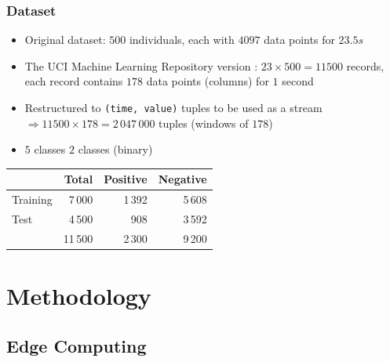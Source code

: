 \documentclass[xelatex,usenames,dvipsnames]{beamer}
\begin{document}
  \begin{frame}
    \frametitle{Dataset}
    \begin{itemize}            
      \item Original dataset\cite{PhysRevE.64.061907}: \(500\) individuals, each with \(4097\) data points for \(23.5s\) 
      
      \item The UCI Machine Learning Repository version \cite{UCIDataset}: \(23 \times 500 = 11500\) records, each record contains \(178\) data points (columns) for \(1\) second
      \item Restructured to \texttt{(time, value)} tuples to be used as a stream \(\Rightarrow 11500 \times 178 = 2\,047\,000\) tuples (windows of \(178\))
      \item \(5\) classes \rightarrow \: \(2\) classes (binary)
  \end{itemize}

  \begin{table}
    {\begin{tabular}{@{} lrrr @{}}
      \toprule
       & Total & Positive & Negative\\
      \midrule
      Training & 7\,000 & 1\,392 & 5\,608\\
      Test & 4\,500& 908 & 3\,592\\
      \addlinespace
      & 11\,500 & 2\,300 & 9\,200\\
      \bottomrule
    \end{tabular}}
  \end{table}

  \end{frame}

  \section{Methodology}
  \subsection{Edge Computing}
  
\end{document}
